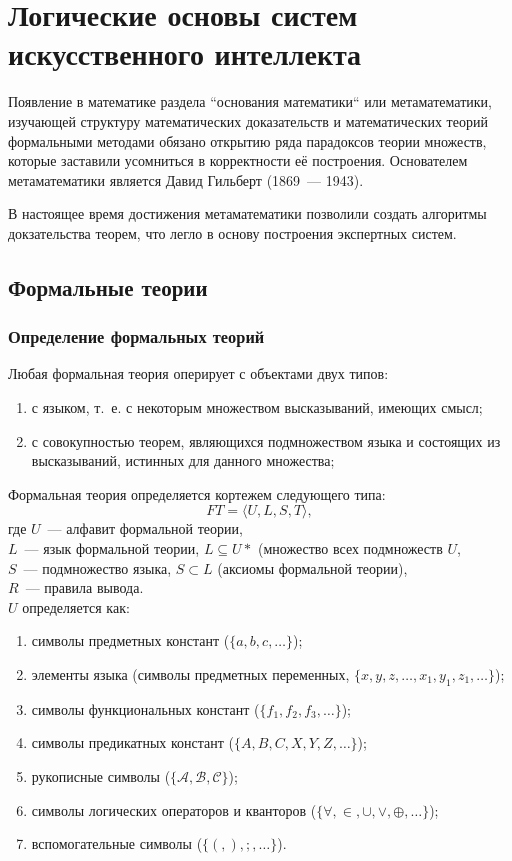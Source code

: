 \documentclass[a4paper,12pt]{report}
\begin{document}
\chapter{Логические основы систем искусственного интеллекта}
	Появление в математике раздела ``основания математики`` или метаматематики,
	изучающей структуру математических доказательств и математических теорий
	формальными методами обязано открытию ряда парадоксов теории множеств,
	которые заставили усомниться в корректности её построения. Основателем
	метаматематики является Давид Гильберт (1869~--- 1943).

	В настоящее время достижения метаматематики позволили создать алгоритмы
	докзательства теорем, что легло в основу построения экспертных систем.


\section{Формальные теории}


\subsection{Определение формальных теорий}

	Любая формальная теория оперирует с объектами двух типов:
	\begin{enumerate}
		\item с языком, т.~е. с некоторым множеством высказываний, имеющих смысл;
		\item с совокупностью теорем, являющихся подмножеством языка и состоящих
			из высказываний, истинных для данного множества;
	\end{enumerate}

	Формальная теория определяется кортежем следующего типа:
	$$ FT = \langle U, L, S, T \rangle, $$
	где $ U $~--- алфавит формальной теории,\\
	$ L $~--- язык формальной теории, $ L \subseteq U* $ (множество всех
	подмножеств $ U $,\\
	$ S $~--- подмножество языка, $ S \subset L $ (аксиомы формальной теории),\\
	$ R $~--- правила вывода.\\

	$ U $ определяется как:
	\begin{enumerate}
		\item символы предметных констант ($ \{a, b, c, \dots \} $);
		\item элементы языка (символы предметных переменных, $ \{x, y, z, \dots,
			x_1, y_1, z_1, \dots \} $);
		\item символы функциональных констант ($ \{f_1, f_2, f_3, \dots \} $);
		\item символы предикатных констант ($ \{A, B, C, X, Y, Z, \dots \} $);
		\item рукописные символы ($ \{\mathscr{A, B, C} \} $);
		\item символы логических операторов и кванторов ($ \{\forall, \in, \cup,
			\vee, \oplus, \dots\} $);
		\item вспомогательные символы ($ \{(, ), ;, \dots\} $).\\
	\end{enumerate}
\end{document}
